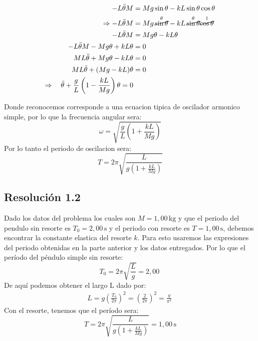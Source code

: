 \documentclass[
  11pt,
  letterpaper,
   addpoints,
   answers
  ]{exam}
\begin{document}
\begin{questions}
\begin{solution}
\begin{align}
  -L\ddot{\theta}M &= Mg\sin\theta - kL \sin\theta \cos\theta \\
  \Rightarrow -L\ddot{\theta}M &= Mg\,\overset{\theta}{\cancel{\sin\theta}} - kL\,\overset{\theta}{\cancel{\sin\theta}}\overset{1}{\cancel{\cos\theta}} \\
  -L\ddot{\theta}M &= Mg\theta - kL\theta \\
  -L\ddot{\theta}M - Mg\theta + kL\theta &= 0 \\
  ML\ddot{\theta} + Mg\theta - kL\theta &= 0 \\
  ML\ddot{\theta} + (Mg - kL)\theta &= 0 \\
  \Rightarrow \quad
  \ddot{\theta} + \frac{g}{L}\left(1 - \frac{kL}{Mg}\right)\theta = 0
\end{align}

Donde reconocemos corresponde a una ecuacion tipica de oscilador armonico simple, por lo que la frecuencia angular sera:
\begin{equation}
  \omega = \sqrt{\frac{g}{L}\left(1 + \frac{kL}{Mg}\right)}
\end{equation}
Por lo tanto el periodo de oscilacion sera:
\begin{equation}
  \boxed{T = 2\pi\sqrt{\frac{L}{g\left(1 + \frac{kL}{Mg}\right)}}}
\end{equation}

  \subsection*{Resolución 1.2}
  Dado los datos del problema los cuales son $M=1{,}00\,\mathrm{kg}$ y que el periodo del pendulo sin resorte es $T_0 = 2{,}00\,\mathrm{s}$ y el periodo con resorte es $T = 1{,}00\,\mathrm{s}$, debemos encontrar la constante elastica del resorte $k$. Para esto usaremos las expresiones del periodo obtenidas en la parte anterior y los datos entregados. Por lo que   el período del péndulo simple sin resorte:
  \begin{equation}
    T_0 = 2\pi\sqrt{\frac{L}{g}} = 2{,}00\
  \end{equation}
  De aquí podemos obtener el largo L dado por:
  \begin{align}
    L = g \left(\frac{T_0}{2\pi}\right)^2 = \left(\frac{2}{2\pi}\right)^2 = \frac{g}{\pi^2}\,
  \end{align}
  Con el resorte, tenemos que el período sera:
  \begin{equation}
    T = 2\pi\sqrt{\frac{L}{g\left(1 + \frac{kL}{Mg}\right)}} = 1{,}00\,\mathrm{s}
  \end{equation}
  

\end{solution}
\end{questions}
\end{document}
